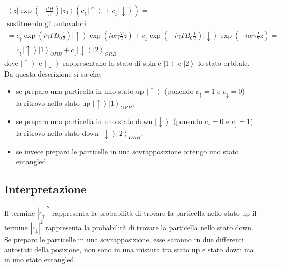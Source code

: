 \begin{equation}\begin{split}
\left\langle z\right| \exp (-\frac{itH}{\bar{h}})\left|z_{0}\right\rangle (c_{\uparrow}\left|\uparrow\right\rangle+c_{\downarrow}\left|\downarrow\right\rangle)=\\
\textrm{sostituendo gli autovalori}\\
=c_{\uparrow}\exp(i \gamma T B_{0}\frac{1}{2}) \left|\uparrow\right\rangle \exp(i \alpha \gamma \frac{T}{2}z)+ c_{\downarrow}\exp(-i \gamma T B_{0}\frac{1}{2}) \left|\downarrow\right\rangle \exp(-i \alpha \gamma \frac{T}{2}z)=\\
=c_{\uparrow}\left|\uparrow\right\rangle \left|1\right\rangle_{ORB} + c_{\downarrow}\left|\downarrow\right\rangle \left|2\right\rangle_{ORB}
\end{split}\end{equation}
dove $\left|\uparrow\right\rangle$ e $\left|\downarrow\right\rangle$ rappresentano lo stato di spin e $\left|1\right\rangle$ e $\left|2\right\rangle$ lo stato orbitale.\\
Da questa descrizione si sa che:
\begin{itemize}
\item se preparo una particella in uno stato up $\left|\uparrow\right\rangle$ (ponendo $c_{\uparrow}=1$ e $c_{\downarrow}=0$)\\la ritrovo nello stato up $\left|\uparrow\right\rangle \left|1\right\rangle_{ORB}$;
\item se preparo una particella in uno stato down $\left|\downarrow\right\rangle$ (ponendo $c_{\uparrow}=0$ e $c_{\downarrow}=1$)\\la ritrovo nello stato down $\left|\downarrow\right\rangle \left|2\right\rangle_{ORB}$;
\item se invece preparo le particelle in una sovrapposizione ottengo uno stato entangled.
\end{itemize}
\subsection{Interpretazione}
Il termine $\left|c_{\uparrow}\right|^2$ rappresenta la probabilità di trovare la particella nello stato up
il termine $\left|c_{\downarrow}\right|^2$ rappresenta la probabilità di trovare la particella nello stato down. Se preparo le particelle in una sovrapposizione, esse saranno in due differenti autostati della posizione, non sono in una mistura tra stato up e stato down ma in uno stato entangled.

